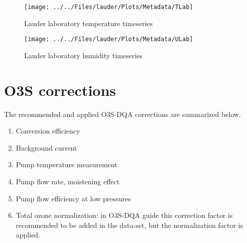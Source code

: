            \begin{figure}
        \centering
\texttt{[image: ../../Files/lauder/Plots/Metadata/TLab]}
    \caption{Lauder laboratory temperature timeseries}
            \label{fig:TLab}
    \end{figure}

               \begin{figure}
        \centering
\texttt{[image: ../../Files/lauder/Plots/Metadata/ULab]}
    \caption{Lauder laboratory humidity timeseries}
            \label{fig:ULab}
    \end{figure}


\section{O3S corrections}
\label{sec:v04}


The recommended and applied O3S-DQA corrections are summarized below.
    \begin{enumerate}
        \item Conversion efficiency
        \item Background current
        \item Pump temperature measurement
        \item Pump flow rate, moistening effect
        \item Pump flow efficiency at low pressures
        \item Total ozone normalization: in O3S-DQA guide this correction factor is recommended to be added in the data-set,
        but the normalization factor is applied.
\end{enumerate}

